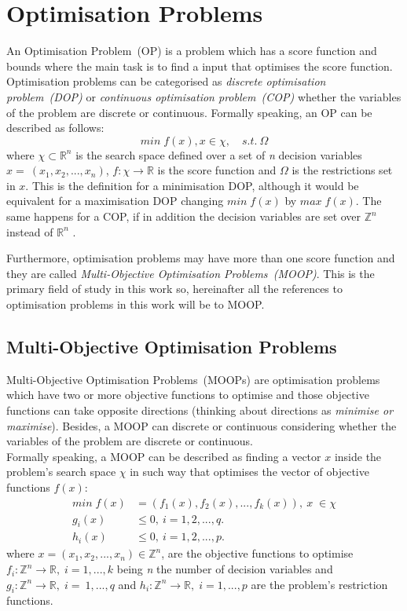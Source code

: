 \section{Optimisation Problems}
An Optimisation Problem~(OP) is a problem which has a score function and bounds where the main task is to find a input that optimises the score function. Optimisation problems can be categorised as \textit{discrete optimisation problem~(DOP)} or \textit{continuous optimisation problem~(COP)} whether the variables of the problem are discrete or continuous. 
Formally speaking, an OP can be described as follows:
\begin{equation*}
min\;f(x), x \in \chi,\quad s.t.\:\Omega
\end{equation*}
where $\chi \subset\mathbb{R}^{n}$ is the search space defined over a set of \textit{n} decision variables  $x = ~(x_{1}, x_{2},..., x_{n})$, $f: \chi \rightarrow \mathbb{R}$ is the score function and $\Omega$ is the restrictions set in $x$. This is the definition for a minimisation DOP, although it would be equivalent for a maximisation DOP changing $min\;f(x)$ by $max\;f(x)$. The same happens for a COP, if in addition the decision variables are set over $\mathbb{Z}^{n}$ instead of $\mathbb{R}^{n}$ .

Furthermore, optimisation problems may have more than one score function and they are called \textit{Multi-Objective Optimisation Problems~(MOOP)}. This is the primary field of study in this work so, hereinafter all the references to optimisation problems in this work will be to MOOP.
\newpage
\subsection{Multi-Objective Optimisation Problems}

Multi-Objective Optimisation Problems~(MOOPs) are optimisation problems which have two or more objective functions to optimise and those objective functions can take opposite directions (thinking about directions as \textit{minimise or maximise}). Besides, a MOOP can discrete or continuous considering whether the variables of the problem are discrete or continuous. \\
Formally speaking, a MOOP can be described as finding a vector \textbf{$x$} inside the problem's search space \textit{$\chi$} in such way that optimises the vector of objective functions \textit{$f(x)$}\cite{search}:
\begin{align*}
min\;f(x) & = (f_{1}(x), f_{2}(x), ..., f_{k}(x)), \: x\;\in\chi \\
 g_{i}(x) & \leq 0, \: i = 1, 2, ..., q. \\
 h_{i}(x) & \leq 0, \: i = 1, 2, ..., p.
\end{align*}
where $x = (x_{1}, x_{2}, ..., x_{n}) \in \mathbb{Z}^{n}$, are the objective functions to optimise $f_{i}: \mathbb{Z}^{n} \rightarrow \mathbb{R}, \; i = 1, ..., k$ being \textit{n} the number of decision variables and $g_{i}: \mathbb{Z}^{n} \rightarrow \mathbb{R}, \; i = ~1, ..., q$ and $h_{i}: \mathbb{Z}^{n} \rightarrow \mathbb{R}, \; i = 1, ..., p$ are the problem's restriction functions.

